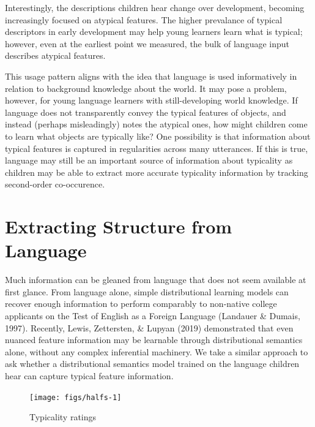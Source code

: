 \documentclass[10pt, letterpaper]{article}
\newenvironment{CodeChunk}{}{}
\begin{document}
Interestingly, the descriptions children hear change over development,
becoming increasingly focused on atypical features. The higher
prevalance of typical descriptors in early development may help young
learners learn what is typical; however, even at the earliest point we
measured, the bulk of language input describes atypical features.

This usage pattern aligns with the idea that language is used
informatively in relation to background knowledge about the world. It
may pose a problem, however, for young language learners with
still-developing world knowledge. If language does not transparently
convey the typical features of objects, and instead (perhaps
misleadingly) notes the atypical ones, how might children come to learn
what objects are typically like? One possibility is that information
about typical features is captured in regularities across many
utterances. If this is true, language may still be an important source
of information about typicality as children may be able to extract more
accurate typicality information by tracking second-order co-occurence.

\hypertarget{extracting-structure-from-language}{%
\section{Extracting Structure from
Language}\label{extracting-structure-from-language}}

Much information can be gleaned from language that does not seem
available at first glance. From language alone, simple distributional
learning models can recover enough information to perform comparably to
non-native college applicants on the Test of English as a Foreign
Language (Landauer \& Dumais, 1997). Recently, Lewis, Zettersten, \&
Lupyan (2019) demonstrated that even nuanced feature information may be
learnable through distributional semantics alone, without any complex
inferential machinery. We take a similar approach to ask whether a
distributional semantics model trained on the language children hear can
capture typical feature information.

\begin{CodeChunk}
\begin{figure}[tb]

{\centering \texttt{[image: figs/halfs-1]} 

}

\caption[Typicality ratings]{Typicality ratings}\label{fig:halfs}
\end{figure}
\end{CodeChunk}
\end{document}
